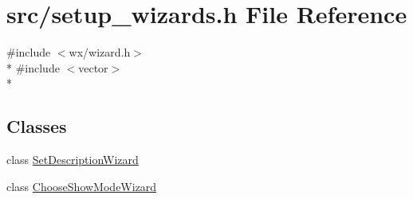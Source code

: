 \hypertarget{a00243}{\section{src/setup\-\_\-wizards.h File Reference}
\label{a00243}
}
{\ttfamily \#include $<$wx/wizard.\-h$>$}\\*
{\ttfamily \#include $<$vector$>$}\\*
\subsection*{Classes}
\begin{DoxyCompactItemize}
\item 
class \hyperlink{a00126}{Set\-Description\-Wizard}
\item 
class \hyperlink{a00051}{Choose\-Show\-Mode\-Wizard}
\end{DoxyCompactItemize}
